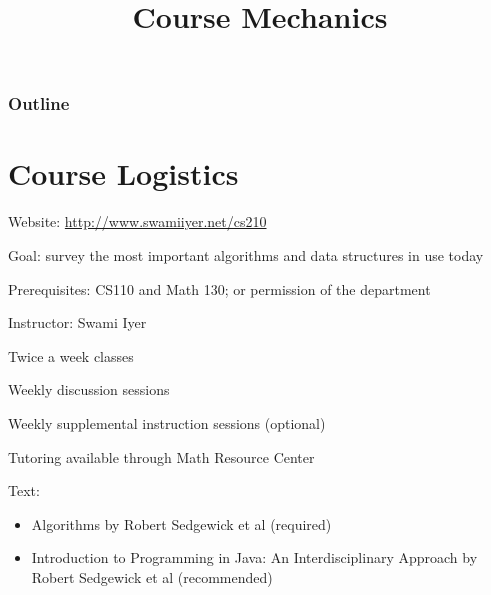 \documentclass[8pt,a4paper,compress,handout]{beamer}
\title{Course Mechanics}
\date{}
\begin{document}
\begin{frame}
\vfill
\titlepage
\end{frame}

\begin{frame}
\frametitle{Outline}
\tableofcontents
\end{frame}

\section{Course Logistics}
\begin{frame}[fragile]
\pause
Website: \href{http://www.swamiiyer.net/cs210}{http://www.swamiiyer.net/cs210}

\pause
\bigskip

Goal: survey the most important algorithms and data structures in use today

\pause
\bigskip

Prerequisites: CS110 and Math 130; or permission of the department

\pause
\bigskip

Instructor: Swami Iyer

\pause
\bigskip

Twice a week classes

\pause
\bigskip
Weekly discussion sessions

\pause
\bigskip

Weekly supplemental instruction sessions (optional)

\pause
\bigskip

Tutoring available through Math Resource Center

\pause
\bigskip

Text: 
\begin{itemize}
\item Algorithms by Robert Sedgewick et al (required)
\item Introduction to Programming in Java: An Interdisciplinary Approach  by Robert Sedgewick et al (recommended)
\end{itemize}
\end{frame}
\end{document}
